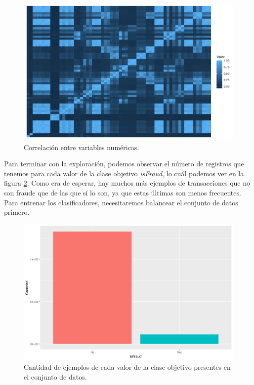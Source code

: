 \begin{figure}
    \includegraphics[width=\textwidth]{images/exploration/correlation-heatmap.png}
    \caption{Correlación entre variables numéricas.}
    \label{fig:correlation-heatmap}
\end{figure}

Para terminar con la exploración, podemos observar el número de registros
que tenemos para cada valor de la clase objetivo \textit{isFraud}, lo cuál
podemos ver en la figura \ref{fig:class-barplot}. Como era de esperar, hay
muchos más ejemplos de transacciones que no son fraude que de las que sí lo son,
ya que estas últimas son menos frecuentes. Para entrenar los clasificadores,
necesitaremos balancear el conjunto de datos primero.

\begin{figure}
    \includegraphics[width=\textwidth]{images/exploration/class-barplot.png}
    \caption{Cantidad de ejemplos de cada valor de la clase objetivo presentes en el conjunto de datos.}
    \label{fig:class-barplot}
\end{figure}

